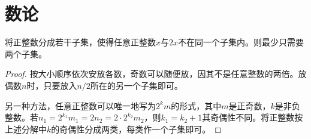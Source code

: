 
\section{数论}
\label{sec:number-theory}

\begin{example}
  将正整数分成若干子集，使得任意正整数$x$与$2x$不在同一个子集内。则最少只需要两个子集。
\end{example}
\begin{proof}
  按大小顺序依次安放各数，奇数可以随便放，因其不是任意整数的两倍。放偶数$n$时，只要放入$n/2$所在的另一个子集即可。

  另一种方法，任意正整数可以唯一地写为$2^km$的形式，其中$m$是正奇数，$k$是非负整数。若$n_1=2^{k_1}m_1 = 2n_2=2\cdot 2^{k_2}m_2$，则$k_1=k_2+1$其奇偶性不同。将正整数按上述分解中$k$的奇偶性分成两类，每类作一个子集即可。
\end{proof}